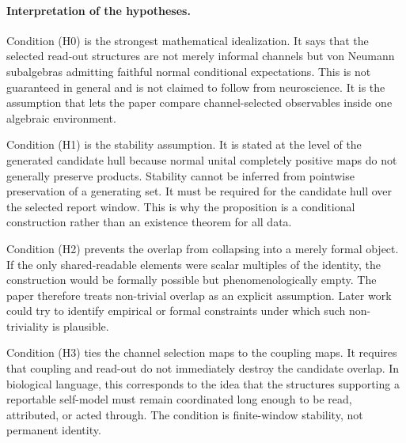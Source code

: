 \documentclass[12pt]{article}
\theoremstyle{definition}
\theoremstyle{remark}
\begin{document}
\paragraph{Interpretation of the hypotheses.}
Condition (H0) is the strongest mathematical idealization. It says that
the selected read-out structures are not merely informal channels but
von Neumann subalgebras admitting faithful normal conditional
expectations. This is not guaranteed in general and is not claimed to
follow from neuroscience. It is the assumption that lets the paper
compare channel-selected observables inside one algebraic environment.

Condition (H1) is the stability assumption. It is stated at the level of
the generated candidate hull because normal unital completely positive
maps do not generally preserve products. Stability cannot be inferred
from pointwise preservation of a generating set. It must be required for
the candidate hull over the selected report window. This is why the
proposition is a conditional construction rather than an existence
theorem for all data.

Condition (H2) prevents the overlap from collapsing into a merely formal
object. If the only shared-readable elements were scalar multiples of
the identity, the construction would be formally possible but
phenomenologically empty. The paper therefore treats non-trivial overlap
as an explicit assumption. Later work could try to identify empirical or
formal constraints under which such non-triviality is plausible.

Condition (H3) ties the channel selection maps to the coupling maps. It
requires that coupling and read-out do not immediately destroy the
candidate overlap. In biological language, this corresponds to the idea
that the structures supporting a reportable self-model must remain
coordinated long enough to be read, attributed, or acted through. The
condition is finite-window stability, not permanent identity.
\end{document}
